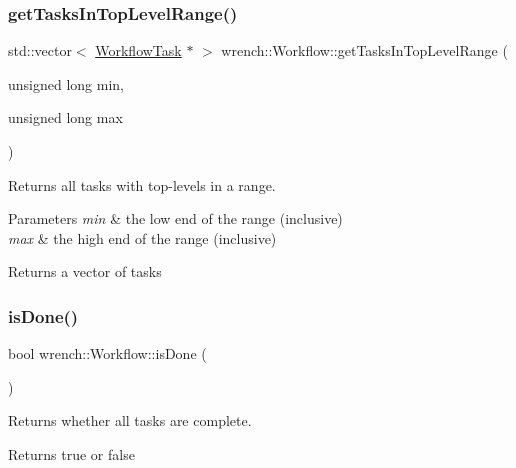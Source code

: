 \subsubsection{\texorpdfstring{get\+Tasks\+In\+Top\+Level\+Range()}{getTasksInTopLevelRange()}}
{\footnotesize\ttfamily std\+::vector$<$ \hyperlink{classwrench_1_1_workflow_task}{Workflow\+Task} $\ast$ $>$ wrench\+::\+Workflow\+::get\+Tasks\+In\+Top\+Level\+Range (\begin{DoxyParamCaption}\item[{unsigned long}]{min,  }\item[{unsigned long}]{max }\end{DoxyParamCaption})}



Returns all tasks with top-\/levels in a range. 


\begin{DoxyParams}{Parameters}
{\em min} & the low end of the range (inclusive) \\
\hline
{\em max} & the high end of the range (inclusive) \\
\hline
\end{DoxyParams}
\begin{DoxyReturn}{Returns}
a vector of tasks 
\end{DoxyReturn}
\mbox{\label{classwrench_1_1_workflow_afc59b67119511acac649652d560f238a}} 
\subsubsection{\texorpdfstring{is\+Done()}{isDone()}}
{\footnotesize\ttfamily bool wrench\+::\+Workflow\+::is\+Done (\begin{DoxyParamCaption}{ }\end{DoxyParamCaption})}



Returns whether all tasks are complete. 

\begin{DoxyReturn}{Returns}
true or false 
\end{DoxyReturn}
\mbox{\label{classwrench_1_1_workflow_ac7048676d96d85a4f59580d4f77da935}} 
